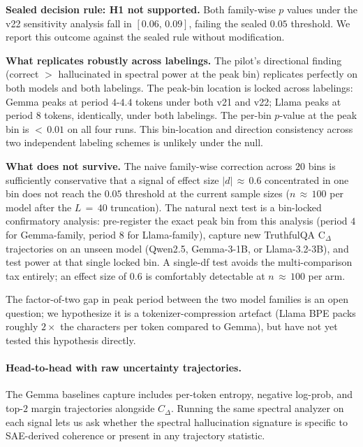 \documentclass[11pt,letterpaper]{article}
\begin{document}
\textbf{Sealed decision rule: H1 not supported.} Both family-wise
$p$ values under the v22 sensitivity analysis fall in $[0.06,\,0.09]$,
failing the sealed $0.05$ threshold. We report this outcome against
the sealed rule without modification.

\textbf{What replicates robustly across labelings.} The pilot's
directional finding (correct $>$ hallucinated in spectral power at the
peak bin) replicates perfectly on both models and both labelings. The
peak-bin location is locked across labelings: Gemma peaks at period
$4$-$4.4$ tokens under both v21 and v22; Llama peaks at period $8$
tokens, identically, under both labelings. The per-bin $p$-value at the
peak bin is $<\,0.01$ on all four runs. This bin-location and direction
consistency across two independent labeling schemes is unlikely under
the null.

\textbf{What does not survive.} The naive family-wise correction across
$20$ bins is sufficiently conservative that a signal of effect size
$|d|\,\approx\,0.6$ concentrated in one bin does not reach the
$0.05$ threshold at the current sample sizes
($n\,\approx\,100$ per model after the $L\,=\,40$ truncation). The
natural next test is a bin-locked confirmatory analysis: pre-register
the exact peak bin from this analysis (period $4$ for Gemma-family,
period $8$ for Llama-family), capture new TruthfulQA C$_\Delta$
trajectories on an unseen model (Qwen2.5, Gemma-3-1B, or Llama-3.2-3B),
and test power at that single locked bin. A single-df test avoids the
multi-comparison tax entirely; an effect size of $0.6$ is comfortably
detectable at $n\,\approx\,100$ per arm.

The factor-of-two gap in peak period between the two model families is
an open question; we hypothesize it is a tokenizer-compression artefact
(Llama BPE packs roughly $2\times$ the characters per token compared to
Gemma), but have not yet tested this hypothesis directly.

\paragraph{Head-to-head with raw uncertainty trajectories.}
The Gemma baselines capture includes per-token entropy, negative
log-prob, and top-$2$ margin trajectories alongside $C_\Delta$. Running
the same spectral analyzer on each signal lets us ask whether the
spectral hallucination signature is specific to SAE-derived coherence
or present in any trajectory statistic.
\end{document}
